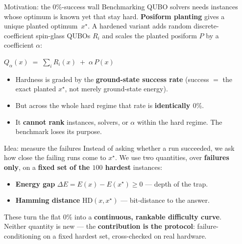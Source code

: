 \documentclass[final]{beamer}
\newcommand{\cimp}{\item[{\color{deepblue}\raisebox{0.12ex}{\footnotesize$\Rightarrow$}}]}
\newcommand{\hl}[1]{{\color{accent}\textbf{#1}}}      %
\newcommand{\sacol}[1]{{\color{saBlue}\textbf{#1}}}
\newcommand{\qpucol}[1]{{\color{qpuRed}\textbf{#1}}}
\newcommand{\xstar}{x^{\star}}
\newcommand{\bnum}[1]{\smash{\raisebox{-0.27cm}{\tikz\node[circle,fill=white,text=deepblue,inner sep=1pt,minimum size=0.82cm,font=\normalsize\bfseries]{#1};}}\hspace{0.2cm}}
\newlength{\sepwid}\newlength{\onecolwid}\newlength{\fullwid}
\begin{document}
\begin{frame}[t]
\vskip0.4cm
\begin{columns}[t]

\begin{column}{\sepwid}\end{column}
\begin{column}{\onecolwid}

\begin{block}{\bnum{1}Motivation: the $0\%$-success wall}
\RaggedRight
Benchmarking QUBO solvers needs instances whose optimum is known yet that stay hard. \textbf{Posiform planting} gives a unique planted optimum~$\xstar$. A hardened variant adds random discrete-coefficient spin-glass QUBOs $R_i$ and scales the planted posiform $P$ by a coefficient $\alpha$:
\vskip0.65cm
\begin{center}\large
$\displaystyle Q_{\alpha}(x) \;=\; \sum_{i} R_i(x) \;+\; \alpha\,P(x)$
\end{center}
\vskip0.65cm
\begin{itemize}
  \item Hardness is graded by the \textbf{ground-state success rate} (success $=$ the exact planted $\xstar$, not merely ground-state energy).
  \item But across the whole hard regime that rate is \hl{identically $0\%$}.
  \cimp It \textbf{cannot rank} instances, solvers, or $\alpha$ within the hard regime. The benchmark loses its purpose.
\end{itemize}
\end{block}

\begin{block}{\bnum{2}Idea: measure the failures}
\RaggedRight
Instead of asking whether a run succeeded, we ask how close the failing runs come to $\xstar$. We use two quantities, over \textbf{failures only}, on a \textbf{fixed set of the $100$ hardest} instances:
\begin{itemize}
  \item \sacol{Energy gap} $\Delta E = E(x)-E(\xstar)\ge 0$ --- depth of the trap.
  \item \qpucol{Hamming distance} $\mathrm{HD}(x,\xstar)$ --- bit-distance to the answer.
\end{itemize}
\vskip0.55cm
These turn the flat $0\%$ into a \textbf{continuous, rankable difficulty curve}. Neither quantity is new --- the \textbf{contribution is the protocol}: failure-conditioning on a fixed hardest set, cross-checked on real hardware.
\end{block}


\end{column}
\end{columns}
\end{frame}
\end{document}

